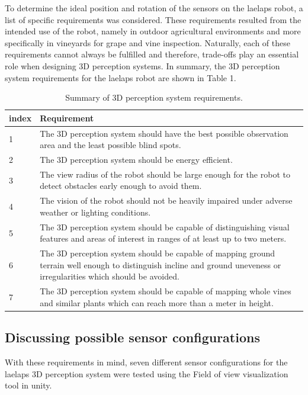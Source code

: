 \documentclass{article}
\begin{document}
To determine the ideal position and rotation of the sensors on the laelaps robot, a list of specific requirements was considered. These requirements resulted from the intended use of the robot, namely  in outdoor agricultural environments and more specifically in vineyards for grape and vine inspection. Naturally, each of these requirements cannot always be fulfilled and therefore, trade-offs play an essential role when designing 3D perception systems. In summary, the 3D perception system requirements for the laelaps robot are shown in Table 1. 

\begin{table}[htbp]
\centering
\begin{tabular}{ | m{1cm} | m{10cm}| } 
  \hline
  \textbf{index} & \textbf{Requirement} \\ 
  \hline
  1 & The 3D perception system should have the best possible observation area and the least possible blind spots. \\ 
  \hline
  2 & The 3D perception system should be energy efficient. \\ 
  \hline
  3 & The view radius of the robot should be large enough for the robot to detect obstacles early enough to avoid them. \\ 
  \hline
  4 & The vision of the robot should not be heavily impaired under adverse weather or lighting conditions. \\ 
  \hline
  5 & The 3D perception system should be capable of distinguishing visual features and areas of interest in ranges of at least up to two meters.  \\ 
  \hline
  6 & The 3D perception system should be capable of mapping ground terrain well enough to distinguish incline and ground uneveness or irregularities which should be avoided. \\ 
  \hline
  7 & The 3D perception system should be capable of mapping whole vines and similar plants which can reach more than a meter in height. \\ 
  \hline
\end{tabular}
\caption{Summary of 3D perception system requirements.}
\end{table}


\subsection{Discussing possible sensor configurations}

With these requirements in mind, seven different sensor configurations for the laelaps 3D perception system were tested using the Field of view visualization tool in unity.
\end{document}
